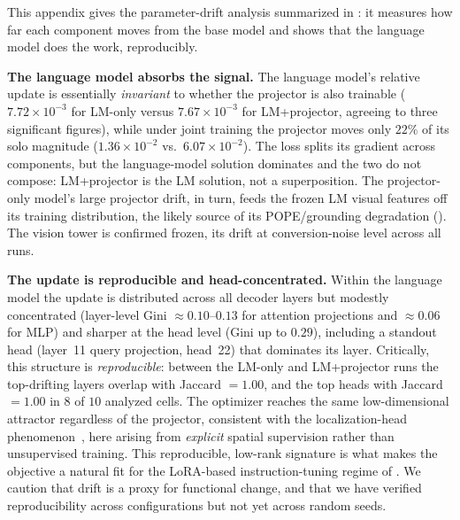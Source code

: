This appendix gives the parameter-drift analysis summarized in : it measures how far each component moves from the base model and shows that the language model does the work, reproducibly.

\textbf{The language model absorbs the signal.} The language model's relative update is essentially \emph{invariant} to whether the projector is also trainable ($7.72\times10^{-3}$ for LM-only versus $7.67\times10^{-3}$ for LM+projector, agreeing to three significant figures), while under joint training the projector moves only $22\%$ of its solo magnitude ($1.36\times10^{-2}$ vs.\ $6.07\times10^{-2}$). The loss splits its gradient across components, but the language-model solution dominates and the two do not compose: LM+projector is the LM solution, not a superposition. The projector-only model's large projector drift, in turn, feeds the frozen LM visual features off its training distribution, the likely source of its POPE/grounding degradation (). The vision tower is confirmed frozen, its drift at conversion-noise level across all runs.

\textbf{The update is reproducible and head-concentrated.} Within the language model the update is distributed across all decoder layers but modestly concentrated (layer-level Gini $\approx 0.10$--$0.13$ for attention projections and $\approx 0.06$ for MLP) and sharper at the head level (Gini up to $0.29$), including a standout head (layer~11 query projection, head~22) that dominates its layer. Critically, this structure is \emph{reproducible}: between the LM-only and LM+projector runs the top-drifting layers overlap with Jaccard $=1.00$, and the top heads with Jaccard $=1.00$ in $8$ of $10$ analyzed cells. The optimizer reaches the same low-dimensional attractor regardless of the projector, consistent with the localization-head phenomenon~\citep{kang2025your, kim2025interpreting}, here arising from \emph{explicit} spatial supervision rather than unsupervised training. This reproducible, low-rank signature is what makes the objective a natural fit for the LoRA-based instruction-tuning regime of . We caution that drift is a proxy for functional change, and that we have verified reproducibility across configurations but not yet across random seeds.
